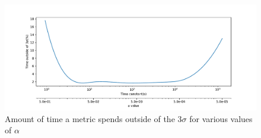\begin{figure}[h]
    \centering
        \includegraphics[width=1\linewidth]{img/napali_eval/a_selection.pdf}
    \caption{Amount of time a metric spends outside of the $3\sigma$ for various values of $\alpha$}
    \label{fig:expdes:6}
\end{figure}

